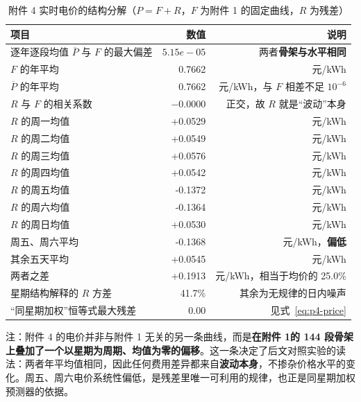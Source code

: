 
\begin{table}[htbp]
  \centering
  \caption{附件 4 实时电价的结构分解（$P=F+R$，$F$ 为附件 1 的固定曲线，$R$ 为残差）}
  \label{tab:p4-struct}
  \footnotesize
  \begin{tabular}{lrr}
    \toprule
    项目 & 数值 & 说明 \\
    \midrule
    逐年逐段均值 $\overline{P}$ 与 $F$ 的最大偏差 & $5.15e-05$ & 两者\textbf{骨架与水平相同} \\
    $F$ 的年平均 & 0.7662 & 元/kWh \\
    $\overline{P}$ 的年平均 & 0.7662 & 元/kWh，与 $F$ 相差不足 $10^{-6}$ \\
    $R$ 与 $F$ 的相关系数 & $-0.0000$ & 正交，故 $R$ 就是``波动''本身 \\
    \midrule
    $R$ 的周一均值 & +0.0529 & 元/kWh \\
    $R$ 的周二均值 & +0.0549 & 元/kWh \\
    $R$ 的周三均值 & +0.0576 & 元/kWh \\
    $R$ 的周四均值 & +0.0542 & 元/kWh \\
    $R$ 的周五均值 & -0.1372 & 元/kWh \\
    $R$ 的周六均值 & -0.1364 & 元/kWh \\
    $R$ 的周日均值 & +0.0530 & 元/kWh \\
    \midrule
    周五、周六平均 & -0.1368 & 元/kWh，\textbf{偏低} \\
    其余五天平均 & +0.0545 & 元/kWh \\
    两者之差 & +0.1913 & 元/kWh，相当于均价的 25.0\% \\
    星期结构解释的 $R$ 方差 & 41.7\% & 其余为无规律的日内噪声 \\
    ``同星期加权''恒等式最大残差 & $0.00$ & 见式~\eqref{eq:p4-price} \\
    \bottomrule
  \end{tabular}
  \par\vspace{2pt}
  \begin{minipage}{.92\textwidth}\footnotesize
    注：附件 4 的电价并非与附件 1 无关的另一条曲线，而是\textbf{在附件 1的 144 段骨架上叠加了一个以星期为周期、均值为零的偏移}。这一条决定了后文对照实验的读法：两者年平均值相同，因此任何费用差异都来自\textbf{波动本身}，不掺杂价格水平的变化。周五、周六电价系统性偏低，是残差里唯一可利用的规律，也正是同星期加权预测器的依据。
  \end{minipage}
\end{table}

